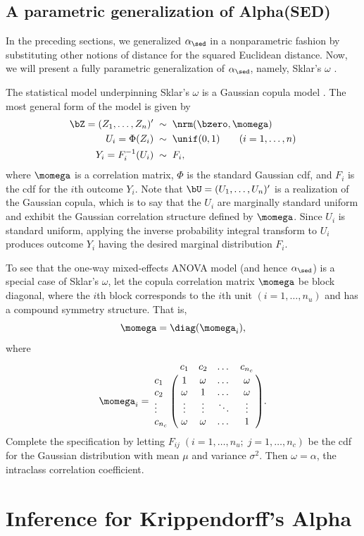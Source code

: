 \subsection{A parametric generalization of Alpha(SED)}
\label{sklarsomega}

In the preceding sections, we generalized $\alpha_\sed$ in a nonparametric fashion by substituting other notions of distance for the squared Euclidean distance. Now, we will present a fully parametric generalization of $\alpha_\sed$, namely, Sklar's $\omega$ \citep{sklarsomega}.

The statistical model underpinning Sklar's $\omega$ is a Gaussian copula model \citep{xue2000multivariate}. The most general form of the model is given by
\begin{align}
\label{gausscop}
\nonumber\bZ = (Z_1,\dots,Z_n)'  & \; \sim\;  \nrm(\bzero,\momega)\\
\nonumber U_i = \Phi(Z_i) & \;\sim\; \unif(0,1)\;\;\;\;\;\;\;(i=1,\dots,n)\\
Y_i = F_i^{-1}(U_i) & \;\sim\; F_i,
\end{align}
where $\momega$ is a correlation matrix, $\Phi$ is the standard Gaussian cdf, and $F_i$ is the cdf for the $i$th outcome $Y_i$. Note that $\bU=(U_1,\dots, U_n)'$ is a realization of the Gaussian copula, which is to say that the $U_i$ are marginally standard uniform and exhibit the Gaussian correlation structure defined by $\momega$. Since $U_i$ is standard uniform, applying the inverse probability integral transform to $U_i$ produces outcome $Y_i$ having the desired marginal distribution $F_i$.

To see that the one-way mixed-effects ANOVA model (and hence $\alpha_\sed$) is a special case of Sklar's $\omega$, let the copula correlation matrix  $\momega$ be block diagonal, where the $i$th block corresponds to the $i$th unit $(i=1,\dots,n_u)$ and has a compound symmetry  structure. That is,
\[
\momega = \diag(\momega_i),
\]
where
\[
\momega_i = \bordermatrix{ & c_1 & c_2 & \dots & c_{n_c} \cr
c_1 & 1 & \omega  &\dots & \omega\cr
c_2 & \omega &  1 &  \dots & \omega\cr
\vdots & \vdots & \vdots  & \ddots  & \vdots\cr
c_{n_c} & \omega &  \omega & \dots  & 1
}.
\]
Complete the specification by letting $F_{ij}\;(i=1,\dots,n_u;\;j=1,\dots,n_c)$ be the cdf for the Gaussian distribution with mean $\mu$ and variance $\sigma^2$. Then $\omega=\alpha$, the intraclass correlation coefficient.

\section{Inference for Krippendorff's Alpha}
\label{inference}


